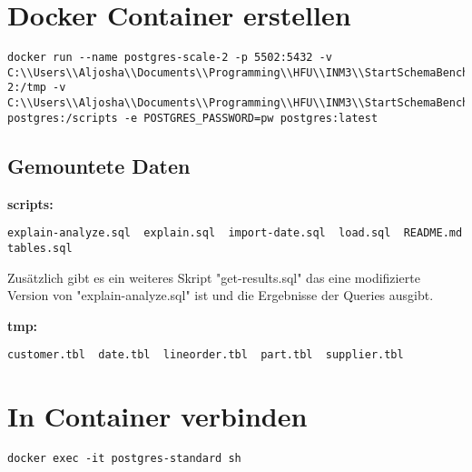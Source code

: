 
\section{Docker Container erstellen}
\begin{lstlisting}[caption=Ohne Config, label=code:ohneconfig]
docker run --name postgres-scale-2 -p 5502:5432 -v C:\\Users\\Aljosha\\Documents\\Programming\\HFU\\INM3\\StartSchemaBenchmark\\generated\\scale-2:/tmp -v C:\\Users\\Aljosha\\Documents\\Programming\\HFU\\INM3\\StartSchemaBenchmark\\Postgres\\ssb-postgres:/scripts -e POSTGRES_PASSWORD=pw postgres:latest
\end{lstlisting}

\subsection{Gemountete Daten}
\noindent \textbf{scripts:}
\begin{lstlisting}[caption=Scripts im Verzeichnis, label=code:scriptfiles]
explain-analyze.sql  explain.sql  import-date.sql  load.sql  README.md  tables.sql
\end{lstlisting}
Zusätzlich gibt es ein weiteres Skript "get-results.sql" das eine modifizierte Version von "explain-analyze.sql" ist und die Ergebnisse der Queries ausgibt.

\noindent \textbf{tmp:}
\begin{lstlisting}[caption=Temporäre Dateien, label=code:tmpfiles]
customer.tbl  date.tbl  lineorder.tbl  part.tbl  supplier.tbl
\end{lstlisting}

\section{In Container verbinden}
\begin{lstlisting}[caption=In Container verbinden, label=code:connectcontainer]
docker exec -it postgres-standard sh
\end{lstlisting}

